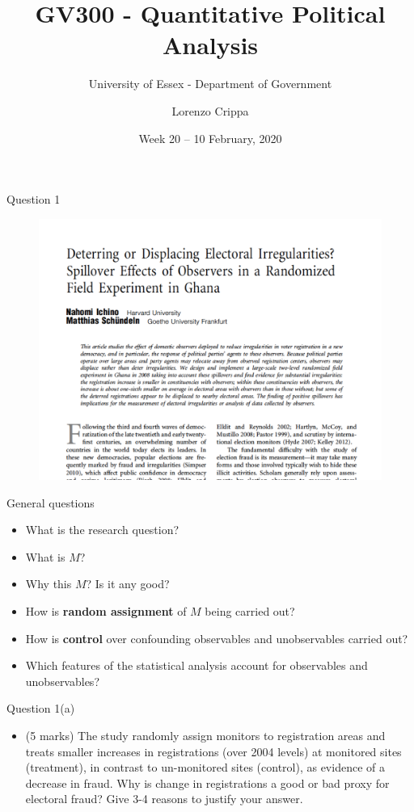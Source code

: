 \documentclass[xcolor=table,dvipsnames]{beamer}
\title{GV300 - Quantitative Political Analysis}
\subtitle{University of Essex - Department of Government}
\date{Week 20 -- 10 February, 2020}				%
\author{Lorenzo Crippa}
\begin{document}
\begin{frame}[plain]
\begin{center}
\titlepage
\end{center}
\end{frame}

\begin{frame}{Question 1}
\begin{figure}[H]\centering
\includegraphics[scale=.35]{pictures/ichinoSchuendeln_title.pdf}
\end{figure}
\end{frame}

\begin{frame}{General questions}
\begin{itemize}
\item What is the research question? \pause
\item What is $M$? \pause
\item Why this $M$? Is it any good?\pause
\item How is \textbf{random assignment} of $M$ being carried out? \pause
\item How is \textbf{control} over confounding observables and unobservables carried out? \pause
\item Which features of the statistical analysis account for observables and unobservables?
\end{itemize}
\end{frame}


\begin{frame}{Question 1(a)}
\begin{itemize}
\item[] (5 marks) The study randomly assign monitors to registration areas and treats smaller increases in registrations (over 2004 levels) at monitored sites (treatment), in contrast to un-monitored sites (control), as evidence of a decrease in fraud. 
Why is change in registrations a good or bad proxy for electoral fraud?
Give 3-4 reasons to justify your answer.
\end{itemize}
\end{frame}
\end{document}
